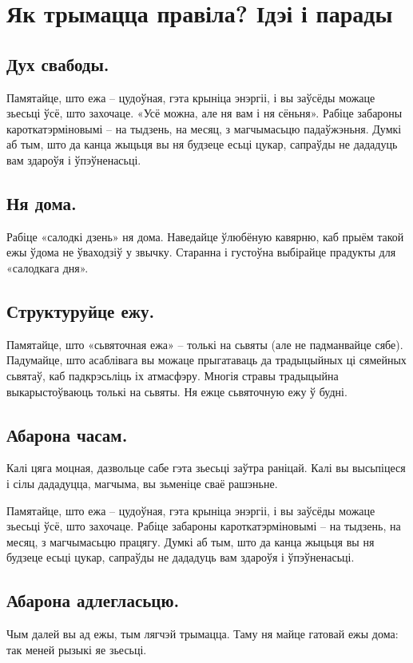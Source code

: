 \section{Як трымацца правіла? Ідэі і парады}

\subsection{Дух свабоды.}
Памятайце, што ежа – цудоўная, гэта крыніца энэргіі, і вы заўсёды можаце зьесьці ўсё, што захочаце. «Усё можна, але ня вам і ня сёньня». Рабіце забароны кароткатэрміновымі – на тыдзень, на месяц, з магчымасьцю падаўжэньня. Думкі аб тым, што да канца жыцьця вы ня будзеце есьці цукар, сапраўды не дададуць вам здароўя і ўпэўненасьці.

\subsection{Ня дома.}
Рабіце «салодкі дзень» ня дома. Наведайце ўлюбёную кавярню, каб прыём такой ежы ўдома не ўваходзіў у звычку. Старанна і густоўна выбірайце прадукты для «салодкага дня».

\subsection{Структуруйце ежу.}
Памятайце, што «сьвяточная ежа» – толькі на сьвяты (але не падманвайце сябе). Падумайце, што асаблівага вы можаце прыгатаваць да традыцыйных ці сямейных сьвятаў, каб падкрэсьліць іх атмасфэру. Многія стравы традыцыйна выкарыстоўваюць толькі на сьвяты. Ня ежце сьвяточную ежу ў будні.

\subsection{Абарона часам.}
Калі цяга моцная, дазвольце сабе гэта зьесьці заўтра раніцай. Калі вы высьпіцеся і сілы дададуцца, магчыма, вы зьменіце сваё рашэньне.

Памятайце, што ежа – цудоўная, гэта крыніца энэргіі, і вы заўсёды можаце зьесьці ўсё, што захочаце. Рабіце забароны кароткатэрміновымі – на тыдзень, на месяц, з магчымасьцю працягу. Думкі аб тым, што да канца жыцьця вы ня будзеце есьці цукар, сапраўды не дададуць вам здароўя і ўпэўненасьці.

\subsection{Абарона адлегласьцю.}
Чым далей вы ад ежы, тым лягчэй трымацца. Таму ня майце гатовай ежы дома: так меней рызыкі яе зьесьці.

